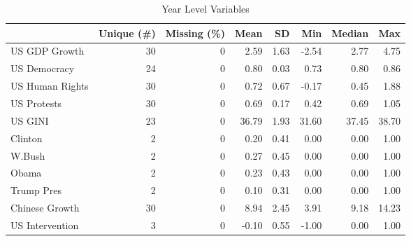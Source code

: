 \begin{table}

\caption{Year Level Variables}
\centering
\begin{tabular}[t]{lrrrrrrr}
\toprule
  & Unique (\#) & Missing (\%) & Mean & SD & Min & Median & Max\\
\midrule
US GDP Growth & 30 & 0 & 2.59 & 1.63 & -2.54 & 2.77 & 4.75\\
US Democracy & 24 & 0 & 0.80 & 0.03 & 0.73 & 0.80 & 0.86\\
US Human Rights & 30 & 0 & 0.72 & 0.67 & -0.17 & 0.45 & 1.88\\
US Protests & 30 & 0 & 0.69 & 0.17 & 0.42 & 0.69 & 1.05\\
US GINI & 23 & 0 & 36.79 & 1.93 & 31.60 & 37.45 & 38.70\\
Clinton & 2 & 0 & 0.20 & 0.41 & 0.00 & 0.00 & 1.00\\
W.Bush & 2 & 0 & 0.27 & 0.45 & 0.00 & 0.00 & 1.00\\
Obama & 2 & 0 & 0.23 & 0.43 & 0.00 & 0.00 & 1.00\\
Trump Pres & 2 & 0 & 0.10 & 0.31 & 0.00 & 0.00 & 1.00\\
Chinese Growth & 30 & 0 & 8.94 & 2.45 & 3.91 & 9.18 & 14.23\\
US Intervention & 3 & 0 & -0.10 & 0.55 & -1.00 & 0.00 & 1.00\\
\bottomrule
\end{tabular}
\end{table}
